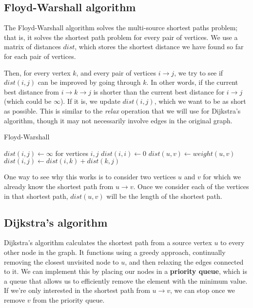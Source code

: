 \subsection{Floyd-Warshall algorithm}

The Floyd-Warshall algorithm solves the multi-source shortest paths problem; that is, it solves the shortest path problem for every pair of vertices. We use a matrix of distances $dist$, which stores the shortest distance we have found so far for each pair of vertices.

Then, for every vertex $k$, and every pair of vertices $i \rightarrow j$, we try to see if $dist(i,j)$ can be improved by going through $k$. In other words, if the current best distance from $i \rightarrow k \rightarrow j$ is shorter than the current best distance for $i \rightarrow j$ (which could be $\infty$). If it is, we update $dist(i,j)$, which we want to be as short as possible. This is similar to the \textit{relax} operation that we will use for Dijkstra's algorithm, though it may not necessarily involve edges in the original graph.

\begin{algorithm}[H]
\caption{Floyd-Warshall}
\begin{algorithmic}
\State $dist(i, j) \gets \infty$ for vertices $i, j$
    \State $dist(i,i) \gets 0$
\EndFor
{}
	\State $dist(u,v) \gets weight(u,v)$
\EndFor
{}
            	\State $dist(i,j) \gets dist(i,k)+dist(k,j)$
            \EndIf
        \EndFor
    \EndFor
\EndFor
\end{algorithmic}
\end{algorithm}

One way to see why this works is to consider two vertices $u$ and $v$ for which we already know the shortest path from $u \rightarrow v$. Once we consider each of the vertices in that shortest path, $dist(u,v)$ will be the length of the shortest path.

\subsection{Dijkstra's algorithm}
Dijkstra's algorithm calculates the shortest path from a source vertex $u$ to every other node in the graph. It functions using a greedy approach, continually removing the closest unvisited node to $u$, and then relaxing the edges connected to it. We can implement this by placing our nodes in a \textbf{priority queue}, which is a queue that allows us to efficiently remove the element with the minimum value. If we're only interested in the shortest path from $u \rightarrow v$, we can stop once we remove $v$ from the priority queue.

